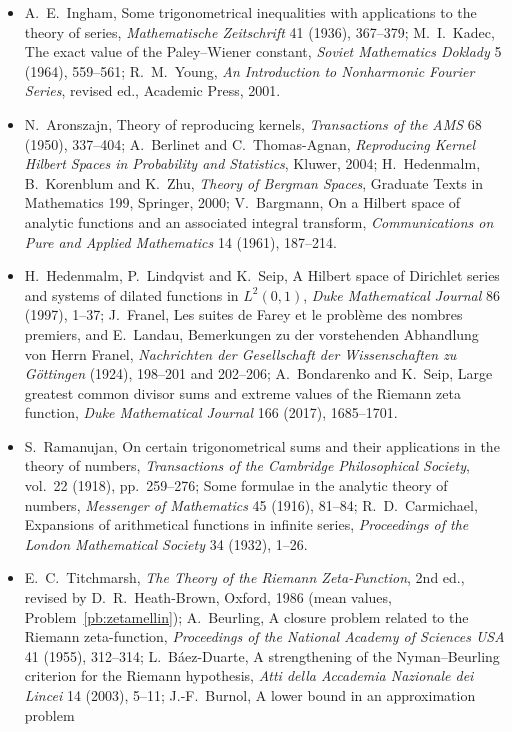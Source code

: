 \begin{itemize}
\item A.~E.~Ingham, Some trigonometrical inequalities with applications to the theory of series, \emph{Mathematische Zeitschrift} 41 (1936), 367--379; M.~I.~Kadec, The exact value of
the Paley--Wiener constant, \emph{Soviet Mathematics Doklady} 5 (1964), 559--561; R.~M.~Young, \emph{An Introduction to Nonharmonic Fourier Series}, revised ed., Academic Press, 2001.
\item N.~Aronszajn, Theory of reproducing kernels, \emph{Transactions of the AMS} 68 (1950), 337--404; A.~Berlinet and C.~Thomas-Agnan, \emph{Reproducing Kernel Hilbert Spaces in
Probability and Statistics}, Kluwer, 2004; H.~Hedenmalm, B.~Korenblum and K.~Zhu, \emph{Theory of Bergman Spaces}, Graduate Texts in Mathematics 199, Springer, 2000;
V.~Bargmann, On a Hilbert space of analytic functions and an associated integral transform, \emph{Communications on Pure and Applied Mathematics} 14 (1961), 187--214.
\item H.~Hedenmalm, P.~Lindqvist and K.~Seip, A Hilbert space of Dirichlet series and systems of dilated functions in $L^2(0,1)$, \emph{Duke Mathematical Journal} 86 (1997), 1--37;
J.~Franel, Les suites de Farey et le problème des nombres premiers, and E.~Landau, Bemerkungen zu der vorstehenden Abhandlung von Herrn Franel, \emph{Nachrichten der Gesellschaft der
Wissenschaften zu Göttingen} (1924), 198--201 and 202--206; A.~Bondarenko and K.~Seip, Large greatest common divisor sums and extreme values of the Riemann zeta function, \emph{Duke
Mathematical Journal} 166 (2017), 1685--1701.
\item S.~Ramanujan, On certain trigonometrical sums and their applications in the theory of numbers, \emph{Transactions of the Cambridge Philosophical Society}, vol.~22 (1918), pp.~259--276;
Some formulae in the analytic theory of numbers, \emph{Messenger of Mathematics} 45 (1916), 81--84; R.~D.~Carmichael, Expansions of arithmetical functions in infinite series,
\emph{Proceedings of the London Mathematical Society} 34 (1932), 1--26.
\item E.~C.~Titchmarsh, \emph{The Theory of the Riemann Zeta-Function}, 2nd ed., revised by D.~R.~Heath-Brown, Oxford, 1986 (mean values, Problem~\ref{pb:zetamellin});
A.~Beurling, A closure problem related to the Riemann zeta-function, \emph{Proceedings of the National Academy of Sciences USA} 41 (1955), 312--314; L.~Báez-Duarte, A strengthening of
the Nyman--Beurling criterion for the Riemann hypothesis, \emph{Atti della Accademia Nazionale dei Lincei} 14 (2003), 5--11; J.-F.~Burnol, A lower bound in an approximation problem

\end{itemize}
